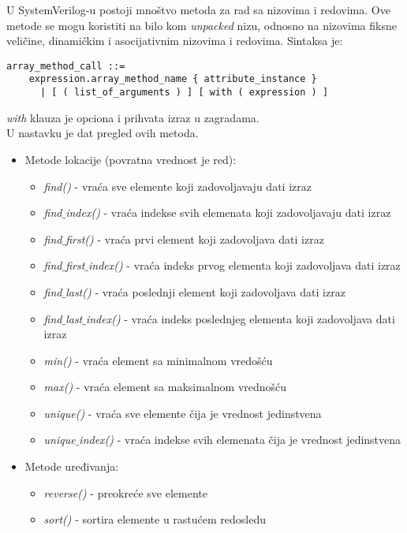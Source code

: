 U SystemVerilog-u postoji mnoštvo metoda za rad sa nizovima i redovima.
Ove metode se mogu koristiti na bilo kom \emph{unpacked} nizu, odnosno na
nizovima fiksne veličine, dinamičkim i asocijativnim nizovima i redovima.
Sintaksa je: 

\begin{verbatim}
array_method_call ::=
    expression.array_method_name { attribute_instance }
      | [ ( list_of_arguments ) ] [ with ( expression ) ]
\end{verbatim}

\emph{with} klauza je opciona i prihvata izraz u zagradama.\\

U nastavku je dat pregled ovih metoda.

\begin{itemize}
\item Metode lokacije (povratna vrednost je red):
  \begin{itemize}
  \item \emph{find()} - vraća sve elemente koji zadovoljavaju dati izraz
  \item \emph{find\(\_\)index()} - vraća indekse svih elemenata koji
    zadovoljavaju dati izraz
  \item \emph{find\(\_\)first()} - vraća prvi element koji zadovoljava dati
    izraz
  \item \emph{find\(\_\)first\(\_\)index()} - vraća indeks prvog elementa koji zadovoljava
    dati izraz
  \item \emph{find\(\_\)last()} - vraća poslednji element koji zadovoljava dati izraz
  \item \emph{find\(\_\)last\(\_\)index()} - vraća indeks poslednjeg elementa koji
    zadovoljava dati izraz
  \item \emph{min()} - vraća element sa minimalnom vredošću
  \item \emph{max()} - vraća element sa maksimalnom vrednošću
  \item \emph{unique()} - vraća sve elemente čija je vrednost jedinstvena
  \item \emph{unique\(\_\)index()} - vraća indekse svih elemenata čija je vrednost
    jedinstvena
  \end{itemize}
\item Metode uređivanja:
  \begin{itemize}
  \item \emph{reverse()} - preokreće sve elemente
  \item \emph{sort()} - sortira elemente u rastućem redosledu

\end{itemize}
\end{itemize}
